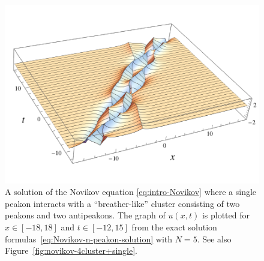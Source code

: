 \documentclass[10pt,a4paper]{article} \pdfoutput=1 
\begin{document}
\begin{figure}
  \centering
  \includegraphics[width=0.95\linewidth]{graphics/novikov-4cluster+single-3d-labels.pdf}
    \caption{A solution of the Novikov equation \eqref{eq:intro-Novikov}
      where a single peakon interacts with a ``breather-like''
      cluster consisting of two peakons and two antipeakons.
      The graph of $u(x,t)$
      is plotted for $x \in [-18,18]$ and $t \in [-12,15]$ from the exact solution
      formulas~\eqref{eq:Novikov-n-peakon-solution} with $N=5$.
      See also Figure~\ref{fig:novikov-4cluster+single}.
    }
  \label{fig:novikov-4cluster+single-3d}
\end{figure}
\end{document}
